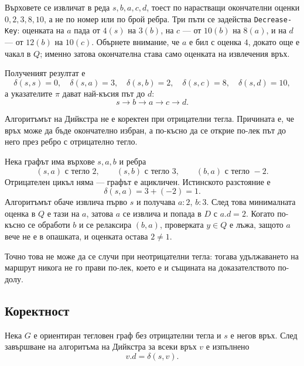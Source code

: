 \begin{example}
Върховете се извличат в реда $s,b,a,c,d$, тоест по нарастващи окончателни оценки $0,2,3,8,10$, а не по номер или по брой ребра. Три пъти се задейства \verb|Decrease-Key|: оценката на $a$ пада от $4(s)$ на $3(b)$, на $c$ --- от $10(b)$ на $8(a)$, и на $d$ --- от $12(b)$ на $10(c)$. Обърнете внимание, че $a$ е бил с оценка $4$, докато още е чакал в $Q$; именно затова окончателна става само оценката на извлечения връх.

Полученият резултат е
\[
\delta(s,s)=0,\quad
\delta(s,a)=3,\quad
\delta(s,b)=2,\quad
\delta(s,c)=8,\quad
\delta(s,d)=10,
\]
а указателите $\pi$ дават най-късия път до $d$:
\[
s\to b\to a\to c\to d.
\]
\end{example}

\begin{supp}[Бележка]
Алгоритъмът на Дийкстра не е коректен при отрицателни тегла. Причината е, че връх може да бъде окончателно избран, а по-късно да се открие по-лек път до него през ребро с отрицателно тегло.
\end{supp}

\begin{example}
Нека графът има върхове $s,a,b$ и ребра
\[
(s,a)\text{ с тегло }2,\qquad
(s,b)\text{ с тегло }3,\qquad
(b,a)\text{ с тегло }-2.
\]
Отрицателен цикъл няма --- графът е ацикличен. Истинското разстояние е
\[
\delta(s,a)=3+(-2)=1.
\]
Алгоритъмът обаче извлича първо $s$ и получава $a{:}2$, $b{:}3$. След това минималната оценка в $Q$ е тази на $a$, затова $a$ се извлича и попада в $D$ с $a.d=2$. Когато по-късно се обработи $b$ и се релаксира $(b,a)$, проверката $y\in Q$ е лъжа, защото $a$ вече не е в опашката, и оценката остава $2\ne 1$.

Точно това не може да се случи при неотрицателни тегла: тогава удължаването на маршрут никога не го прави по-лек, което е и същината на доказателството по-долу.
\end{example}

\subsection{Коректност}\label{s:8.3.5}

\begin{keythm}
Нека $G$ е ориентиран тегловен граф без отрицателни тегла и $s$ е негов връх. След завършване на алгоритъма на Дийкстра за всеки връх $v$ е изпълнено
\[
v.d=\delta(s,v).
\]
\end{keythm}

